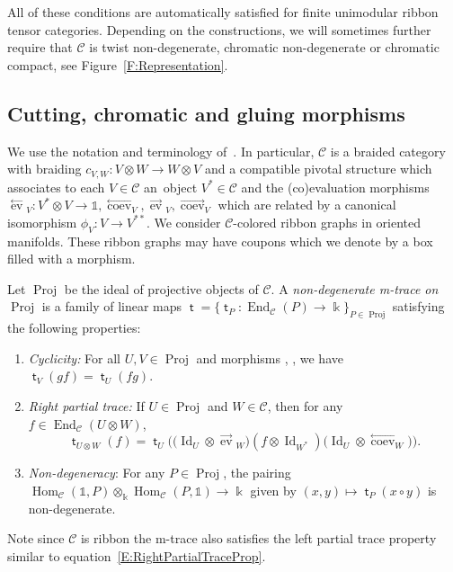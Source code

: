 \documentclass[pdftex]{sigma}
\numberwithin{equation}{section}
\newcommand{\Proj}{\operatorname{Proj}}
\newcommand{\tto}{\xrightarrow}
\numberwithin{theorem}{section}
\numberwithin{proposition}{section}
\numberwithin{definition}{section}
\numberwithin{lemma}{section}
\numberwithin{corollary}{section}
\numberwithin{remark}{section}
\numberwithin{example}{section}
\newcommand{\rcoev}{\stackrel{\longrightarrow}{\operatorname{coev}}}
\newcommand{\rev}{\stackrel{\longrightarrow}{\operatorname{ev}}\!\!}
\newcommand{\lev}{\stackrel{\longleftarrow}{\operatorname{ev}}\!\!}
\newcommand{\lcoev}{\stackrel{\longleftarrow}{\operatorname{coev}}}
\newcommand{\bp}[1]{{\left(#1\right)}}
\newcommand{\cat}{\mathcal{C}}
\newcommand{\End}{\operatorname{End}}
\newcommand{\Hom}{\operatorname{Hom}}
\newcommand{\unit}{\ensuremath{\mathds{1}}}
\newcommand{\Id}{\operatorname{Id}}
\newcommand{\FK}{{\Bbbk}}
\newcommand{\mt}{{\operatorname{\mathsf{t}}}}
\newcommand{\qt}{\operatorname{\mathsf{t}}}
\begin{document}
All of these conditions are automatically satisfied for finite unimodular ribbon tensor categories. Depending on the constructions, we will sometimes further require that $\cat$ is twist non-degenerate, chromatic non-degenerate or chromatic compact, see Figure~\ref{F:Representation}.

 \subsection{Cutting, chromatic and gluing morphisms}\label{SS:Def-gluingmorph}
 We use the notation and terminology of~\cite{CGP22}. In particular,
$\cat$ is a braided category with braiding
$c_{V,W}\colon V\otimes W\to W\otimes V$ and a compatible pivotal structure
which associates to each $V \in \cat$ an~object $V^*\in \cat$ and the
(co)evaluation morphisms $\lev_V\colon V^*\otimes V \to \unit, \lcoev_V, \rev_V,\rcoev_V$ which are
related by a canonical isomorphism $\phi_V\colon V\to V^{**}$. We consider
$\cat$-colored ribbon graphs in oriented manifolds. These ribbon
graphs may have coupons which we denote by a box filled with a morphism.

\begin{definition}
 Let $\Proj$ be the ideal of projective objects of $\cat$. A
\emph{non-degenerate m-trace on $\Proj$} is a family of linear maps
$\mt=\{\mt_P\colon\End_\cat(P)\to\FK\}_{P\in\Proj}$ satisfying the
following properties:
\begin{enumerate}\itemsep=0pt
\item \textit{Cyclicity:} For all $U,V\in \Proj$ and morphisms
 \smash{$ V\tto f U$}, \smash{$U\tto g V$}, we have $ \qt_V(g f)=\qt_U(f g)$.
\item \textit{Right partial trace:} %
 If
 $U\in \Proj$ and $W\in \cat$, then for any
 $f\in \End_\cat(U\otimes W)$,
\begin{equation}\label{E:RightPartialTraceProp}
 \qt_{U\otimes W}\bp{f}
 =\qt_U\bigl(\bigl(\Id_U \otimes \rev_W\bigr)(f\otimes \Id_{W^*})\bigl(\Id_U \otimes \lcoev_W\bigr)\bigr).
\end{equation}
\item \textit{Non-degeneracy}: For any $P\in\Proj$, the pairing
 $\Hom_\cat(\unit,P)\otimes_\FK\Hom_\cat(P,\unit)\to\FK$ given by
 $(x,y)\mapsto\mt_P(x\circ y)$ is non-degenerate.
\end{enumerate}
Note since $\cat$ is ribbon the m-trace also satisfies the left
partial trace property similar to equation~\eqref{E:RightPartialTraceProp}.
\end{definition}
\end{document}

